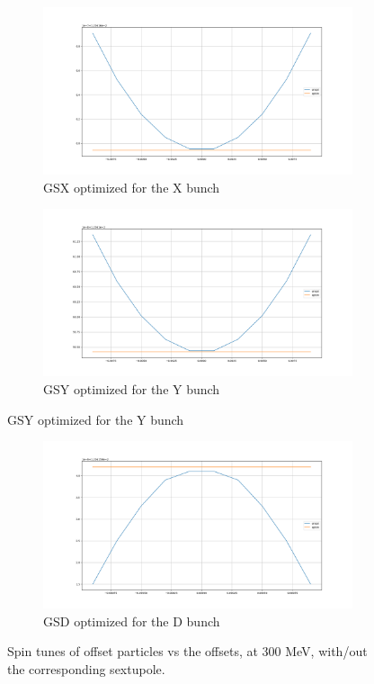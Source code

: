 \documentclass{article}
\begin{document}
\begin{figure}
  \centering
  \begin{subfigure}[b]{\textwidth}\centering
    \includegraphics[width=\textwidth]{img/SPINTUNE_X_GSX_optim}
    \caption{GSX optimized for the X bunch}
  \end{subfigure}
  \begin{subfigure}[b]{\textwidth}\centering
    \includegraphics[width=\textwidth]{img/SPINTUNE_Y_GSY_optim}
    \caption{GSY optimized for the Y bunch}
  \end{subfigure}
\end{figure}
\begin{figure}\ContinuedFloat
  \begin{subfigure}[b]{\textwidth}\centering
    \includegraphics[width=\textwidth]{img/SPINTUNE_D_GSD_optim}
    \caption{GSD optimized for the D bunch}
  \end{subfigure}
  \caption{Spin tunes of offset particles vs the offsets, at 300 MeV, with/out the corresponding sextupole.\label{fig:OptSext}}
\end{figure}
\end{document}

